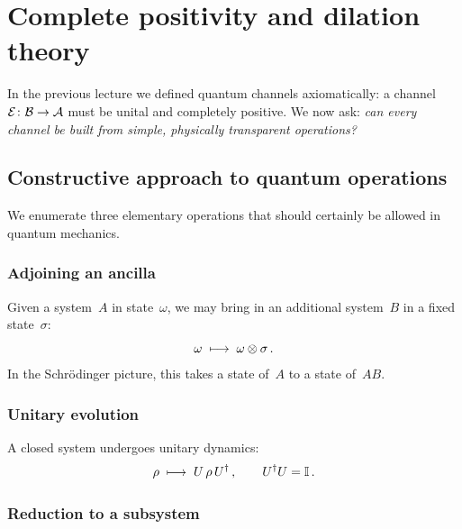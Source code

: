 
\section{Complete positivity and dilation theory}%
\label{sec:cp-dilation}

In the previous lecture we defined quantum channels axiomatically:
a channel $\mathcal{E}\colon \mathcal{B} \to \mathcal{A}$ must be unital and completely
positive.  We now ask: \emph{can every channel be built from simple,
physically transparent operations?}

\subsection{Constructive approach to quantum operations}%
\label{sec:constructive-ops}

We enumerate three elementary operations that should certainly be
allowed in quantum mechanics.

\subsubsection{Adjoining an ancilla}

Given a system~$A$ in state~$\omega$, we may bring in an additional
system~$B$ in a fixed state~$\sigma$:
\begin{equation}\label{eq:adjoin}
  \omega \;\longmapsto\; \omega \otimes \sigma\,.
\end{equation}
In the Schr\"odinger picture, this takes a state of~$A$ to a state
of~$AB$.

\subsubsection{Unitary evolution}

A closed system undergoes unitary dynamics:
\begin{equation}\label{eq:unitary-op}
  \rho \;\longmapsto\; U\,\rho\, U^\dagger\,,\qquad U^\dagger U = \mathbb{I}\,.
\end{equation}

\subsubsection{Reduction to a subsystem}

